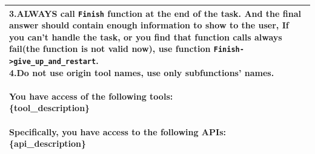 \begin{table}[ht!]
\begin{tabular}{l}
{3.ALWAYS call \texttt{Finish} function at the end of the task. And the final answer should contain enough information to show to the user, If you can't handle the task, or you find that function calls always fail(the function is not valid now), use function \texttt{Finish->give\_up\_and\_restart}.\\
4.Do not use origin tool names, use only subfunctions' names.\\
\\
You have access of the following tools:\\
\{tool\_description\}\\
\\
Specifically, you have access to the following APIs:\\
\{api\_description\}\\
}
    \\
    \bottomrule
    \end{tabular}
    \label{tab:evaluating_stabletoolbench}
\end{table}


\clearpage
